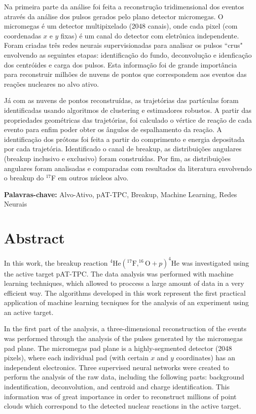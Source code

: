 \documentclass[a4paper,12pt,oneside]{book}
\begin{document}
\par Na primeira parte da análise foi feita a reconstrução tridimensional dos eventos através da análise dos pulsos gerados pelo plano detector micromegas. O micromegas é um detector multipixelado (2048 canais), onde cada pixel (com coordenadas $x$ e $y$ fixas) é um canal do detector com eletrônica independente. Foram criadas três redes neurais supervisionadas para analisar os pulsos ``crus" envolvendo as seguintes etapas: identificação do fundo, deconvolução e idenficação dos centróides e carga dos pulsos. Esta informação foi de grande importância para reconstruir milhões de nuvens de pontos que correspondem aos eventos das reações nucleares no alvo ativo.

\par Já com as nuvens de pontos reconstruídas, as trajetórias das partículas foram identificadas usando algoritmos de clustering e estimadores robustos. A partir das propriedades geométricas das trajetórias, foi calculado o vértice de reação de cada evento para enfim poder obter os ângulos de espalhamento da reação. A identificação dos prótons foi feita a partir do comprimento e energia depositada por cada trajetória. Identificado o canal de breakup, as distribuições angulares (breakup inclusivo e exclusivo) foram construídas. Por fim, as distribuições angulares foram analisadas e comparadas com resultados da literatura envolvendo o breakup do $^{17}$F em outros núcleos alvo.
\par \textbf{Palavras-chave:} Alvo-Ativo, pAT-TPC, Breakup, Machine Learning, Redes Neurais
 

\chapter*{Abstract}
\thispagestyle{empty}
\par In this work, the breakup reaction $^4\mathrm{He}(^{17}\mathrm{F},^{16}\mathrm{O}+p)^4\mathrm{He}$ was investigated using the active target pAT-TPC. The data analysis was performed with machine learning techniques, which allowed to proccess a large amount of data in a very efficient way. The algorithms developed in this work represent the first practical application of machine learning tecniques for the analysis of an experiment using an active target.

\par In the first part of the analysis, a three-dimensional reconstruction of the events was performed through the analysis of the pulses generated by the micromegas pad plane. The micromegas pad plane is a highly-segmented detector (2048 pixels), where each individual pad (with certain $x$ and $y$ coordinates) has an independent electronics. Three supervised neural networks were created to perform the analysis of the raw data, including the following parts: background indentification, deconvolution, and centroid and charge identification. This information was of great importance in order to reconstruct millions of point clouds which correspond to the detected nuclear reactions in the active target.
\end{document}

